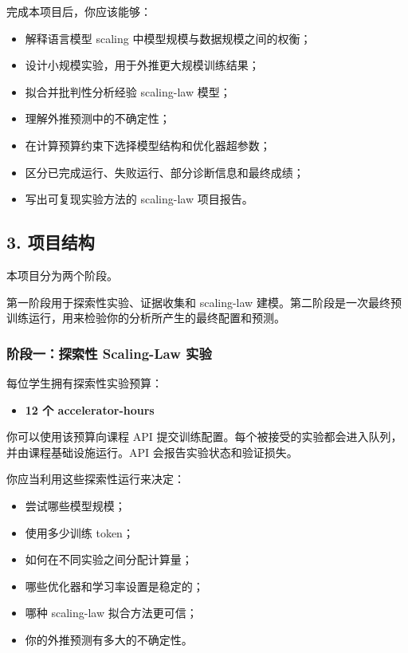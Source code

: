 \documentclass[
  11pt,
]{ctexart}
\providecommand{\tightlist}{%
  \setlength{\itemsep}{0pt}\setlength{\parskip}{0pt}}
\begin{document}
完成本项目后，你应该能够：

\begin{itemize}
\tightlist
\item
  解释语言模型 scaling 中模型规模与数据规模之间的权衡；
\item
  设计小规模实验，用于外推更大规模训练结果；
\item
  拟合并批判性分析经验 scaling-law 模型；
\item
  理解外推预测中的不确定性；
\item
  在计算预算约束下选择模型结构和优化器超参数；
\item
  区分已完成运行、失败运行、部分诊断信息和最终成绩；
\item
  写出可复现实验方法的 scaling-law 项目报告。
\end{itemize}

\hypertarget{ux9879ux76eeux7ed3ux6784}{%
\subsection{3. 项目结构}\label{ux9879ux76eeux7ed3ux6784}}

本项目分为两个阶段。

第一阶段用于探索性实验、证据收集和 scaling-law 建模。第二阶段是一次最终预训练运行，用来检验你的分析所产生的最终配置和预测。

\hypertarget{ux9636ux6bb5ux4e00ux63a2ux7d22ux6027-scaling-law-ux5b9eux9a8c}{%
\subsubsection{阶段一：探索性 Scaling-Law
实验}\label{ux9636ux6bb5ux4e00ux63a2ux7d22ux6027-scaling-law-ux5b9eux9a8c}}

每位学生拥有探索性实验预算：

\begin{itemize}
\tightlist
\item
  \textbf{12 个 accelerator-hours}
\end{itemize}

你可以使用该预算向课程 API
提交训练配置。每个被接受的实验都会进入队列，并由课程基础设施运行。API
会报告实验状态和验证损失。

你应当利用这些探索性运行来决定：

\begin{itemize}
\tightlist
\item
  尝试哪些模型规模；
\item
  使用多少训练 token；
\item
  如何在不同实验之间分配计算量；
\item
  哪些优化器和学习率设置是稳定的；
\item
  哪种 scaling-law 拟合方法更可信；
\item
  你的外推预测有多大的不确定性。
\end{itemize}
\end{document}
